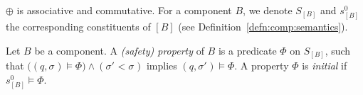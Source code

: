 \documentclass{llncs}
\newcommand{\todoSB}[2][color=green!40, size=\tiny]{\todo[#1]{\textbf{To-do Simon:} {#2}}}
\newcommand{\todoLH}[2][color=orange!40, size=\tiny]{\todo[#1]{\textbf{To-do Ludo:} {#2}}}
\newcommand{\prop}[1]{Prop.~\ref{prop:#1}}
\newcommand{\cB}{\ensuremath{\mathcal{B}}}
\newcommand{\mdash}[1][]{---#1}
\newcommand{\ie}[1][\ ]{i.e.#1}
\newcommand{\goesto}[2][]{\ensuremath{\xrightarrow[{#1}\relax]{#2}}}
\newcommand{\true} {\ensuremath{\mathtt{t\!t}}}
\newcommand{\noop} {\ensuremath{\emptyset}} %
\newcommand{\order}{<}
\newcommand{\val}[3][]{\ensuremath{#1{\sigma}^{#2}_{#3}}}
\newcommand{\primeit}[1]{#1'}
\newcommand{\semopen}[1]{\ensuremath{[{#1}]}}
\newcommand{\arcomp}{\oplus}
\newcommand{\arequiv}{\equiv}
\begin{document}
$\arcomp$ is associative and commutative.
%
For a component $B$, we denote $S_{\semopen{B}}$ and
$s^0_{\semopen{B}}$ the corresponding constituents of
$\semopen{B}$ (see Definition~\ref{defn:comp:semantics}).

\begin{definition}[Properties]
  \label{defn:property}
  Let $B$ be a component.  A \emph{(safety) property} 
  of $B$ is a predicate $\Phi$ on
  $S_{\semopen{B}}$, such that $\bigl((q,
  \val{}{}) \models \Phi\bigr) \land (\val[\primeit]{}{} \order
  \val{}{})$ implies $(q, \val[\primeit]{}{}) \models \Phi$.
  A property $\Phi$ is \emph{initial} if
  $s^0_{\semopen{B}} \models \Phi$.
\end{definition}
\end{document}
